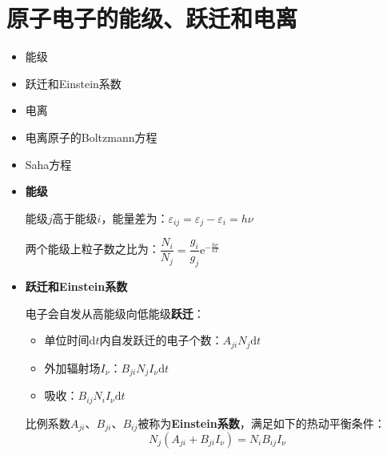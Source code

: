 \documentclass{beamer}
\renewcommand\epsilon{\varepsilon}
\let\sectiononly\section
\renewcommand{\section}[1]{
    \sectiononly{#1}
    \let\sectiontitle\relax
    \newcommand{\sectiontitle}{#1}
}
\newenvironment{slide}{
    \begin{frame}{\bfseries{\sectiontitle}}
}{
    \end{frame}
}
\begin{document}
\section{原子电子的能级、跃迁和电离}

\begin{slide}
    \begin{itemize}
        \item 能级
        \item 跃迁和Einstein系数
        \item 电离
        \item 电离原子的Boltzmann方程
        \item Saha方程
    \end{itemize}
\end{slide}

\begin{slide}
    \begin{itemize}
        \item \textbf{能级}

        能级$j$高于能级$i$，能量差为：$\epsilon_{ij}=\epsilon_j-\epsilon_i=h\nu$

        两个能级上粒子数之比为：$\dfrac{N_i}{N_j} = \dfrac{g_i}{g_j}\mathrm{e}^{-\tfrac{h\nu}{kT}}$

        \item \textbf{跃迁和Einstein系数}

        电子会自发从高能级向低能级\textbf{跃迁}：
        \begin{itemize}
            \item 单位时间$\mathrm{d}t$内自发跃迁的电子个数：$A_{ji}N_j\mathrm{d}t$

            \item 外加辐射场$I_\nu$：$B_{ji}N_jI_\nu\mathrm{d}t$

            \item 吸收：$B_{ij}N_iI_\nu\mathrm{d}t$
        \end{itemize}

        比例系数$A_{ji}$、$B_{ji}$、$B_{ij}$被称为\textbf{Einstein系数}，满足如下的热动平衡条件：
        \[
            \boxed{
            N_j(A_{ji}+B_{ji}I_\nu) = N_iB_{ij}I_\nu
            }
        \]
    \end{itemize}
\end{slide}
\end{document}

